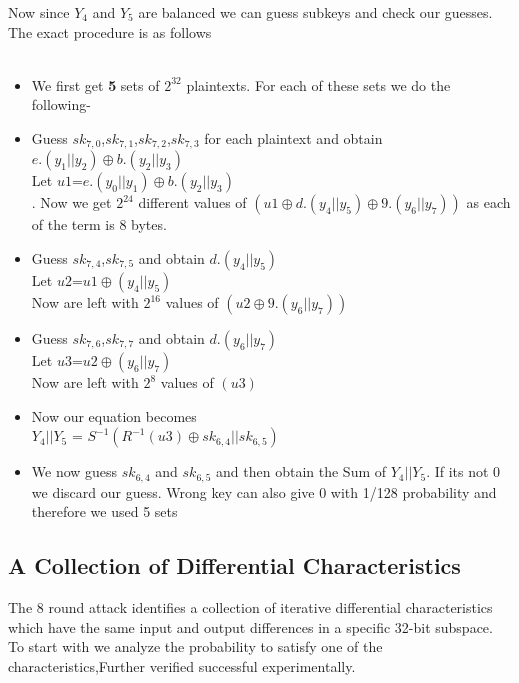 \documentclass[preprint]{transcrypto}
\begin{document}
Now since $Y_{4}$ and $Y_{5}$ are balanced we can guess subkeys and check our guesses. \\ The exact procedure is as follows \\ \\
\begin{itemize}
	\item We first get \textbf{5} sets of $2^{32}$ plaintexts. For each of these sets we do the following-
	\item Guess $sk_{7,0}$,$sk_{7,1}$,$sk_{7,2}$,$sk_{7,3}$ for each plaintext and obtain $e.(y_{1}||y_{2})\oplus b.(y_{2}||y_{3})$\\
	Let $u1$=$e.(y_{0}||y_{1})\oplus b.(y_{2}||y_{3})$ \\.
	Now we get $2^{24}$ different values of $(u1\oplus d.(y_{4}||y_{5})\oplus9.(y_{6}|| y_{7}))$ as each of the term is 8 bytes.
	
	\item Guess $sk_{7,4}$,$sk_{7,5}$ and obtain 
	$d.(y_{4}||y_{5})$\\
	Let $u2$=$u1 \oplus (y_{4}||y_{5})$  \\  
	Now are left with $2^{16}$ values of $(u2\oplus9.(y_{6}|| y_{7}))$ \\
	\item Guess $sk_{7,6}$,$sk_{7,7}$ and obtain 
	$d.(y_{6}||y_{7})$\\
	Let $u3$=$u2 \oplus (y_{6}||y_{7})$  \\  
	Now are left with $2^8$ values of $(u3)$ \\
	 \item Now our equation becomes \\
	 $Y_{4}||Y_{5}$ = $S^{-1}(R^{-1}(u3)
	 \oplus sk_{6,4} || sk_{6,5})$\\
	 \item We now guess $sk_{6,4}$ and $sk_{6,5}$ and then obtain the Sum of $Y_{4}||Y_{5}$. If its not 0 we discard our guess. Wrong key can also give 0  with 1/128 probability and therefore we used 5 sets
\end{itemize}


\subsection{A Collection of Differential Characteristics \cite{8round}} 
The 8 round attack identifies a collection of iterative differential characteristics which have
the same input and output differences in a specific 32-bit subspace. To start with we analyze the probability to satisfy one of the characteristics,Further verified successful experimentally.
\end{document}
